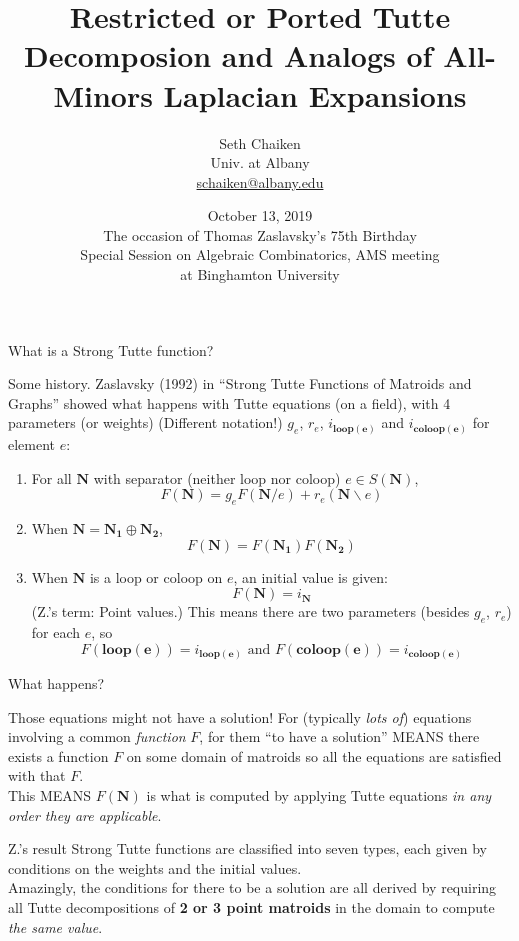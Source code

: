 \documentclass{beamer}
\title{Restricted or Ported Tutte Decomposion and Analogs
  of All-Minors Laplacian Expansions}
\author{Seth Chaiken\\
Univ. at Albany\\
\url{schaiken@albany.edu}
}
\date{October 13, 2019\\
  The occasion of Thomas Zaslavsky's 75th Birthday\\
  Special Session on Algebraic Combinatorics, AMS meeting\\
at Binghamton University}
\newcommand{\ext}[1]{\ensuremath{\mathbf{#1}}}
\begin{document}
\begin{frame}
 \titlepage
\end{frame}

\begin{frame}{What is a Strong Tutte function?}
  
  Some history.
  Zaslavsky (1992) in ``Strong Tutte Functions of Matroids and Graphs'' showed what happens
  with Tutte equations (on a field), with 4 parameters (or weights) (Different notation!)
  $g_e$, $r_e$,
  $i_{\ext{loop(e)}}$ and $i_{\ext{coloop(e)}}$
  for element $e$:

  \begin{enumerate}
  \item For all $\ext{N}$ with separator (neither loop nor coloop) $e\in S(\ext{N})$,
    \[
    F(\ext{N}) = g_eF(\ext{N}/e) + r_e(\ext{N}\backslash e)
    \]
  \item When $\ext{N}=\ext{N_1}\oplus\ext{N_2}$,
    \[
    F(\ext{N}) = F(\ext{N_1})F(\ext{N_2})
    \]
  \item When $\ext{N}$ is a loop or coloop on $e$, an initial value is given:
    \[
    F(\ext{N}) = i_{\ext{N}}
    \]
    (Z.'s term: Point values.)
    This means there are two parameters (besides $g_e$, $r_e$) for each $e$, so
    \[
    F(\ext{loop(e)})=i_{\ext{loop(e)}} \text{\ and\ } F(\ext{coloop(e)})=i_{\ext{coloop(e)}}
     \]
  \end{enumerate}
\end{frame}

\begin{frame}{What happens?}
  \begin{block}{Those equations might not have a solution!}
    For (typically \emph{lots of}) equations involving a common \emph{function} $F$, for them
    ``to have a solution'' MEANS there exists a function $F$ on some domain of matroids
    so all the equations are satisfied with that $F$.\\
 This MEANS $F(\ext{N})$ is what is computed by applying Tutte
 equations \emph{in any order they are applicable}.
  \end{block}
  \begin{block}{Z.'s result}
    Strong Tutte functions are classified into seven types, each given by
    conditions on the weights and the initial values.\\
    Amazingly, the conditions for there to be a solution are all derived by
    requiring all Tutte decompositions of \textbf{2 or 3 point matroids} in the domain
    to compute \emph{the same value}.
      \end{block}
\end{frame}
\end{document}
